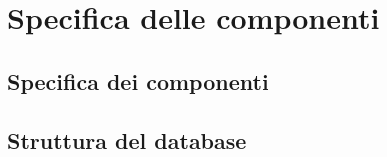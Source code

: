 \section{Specifica delle componenti}
\label{sec:Specifica delle componenti}

\subsection{Specifica dei componenti}
\label{sub:Specifica dei componenti}



\subsection{Struttura del database}
\label{sub:Struttura del database}


